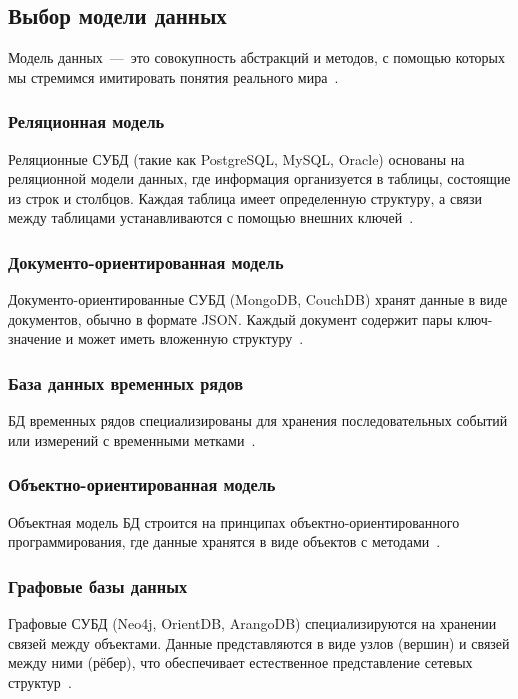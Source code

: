 \subsection{Выбор модели данных}

\noindent
\hspace{0.75cm}
Модель данных~---~это совокупность абстракций и методов, с помощью которых мы стремимся имитировать понятия реального мира~\cite{komarov}.

\subsubsection{Реляционная модель}

\noindent
\hspace{0.75cm}
Реляционные СУБД (такие как PostgreSQL, MySQL, Oracle) основаны на реляционной модели данных, где информация организуется в таблицы, состоящие из строк и столбцов. Каждая таблица имеет определенную структуру, а связи между таблицами устанавливаются с помощью внешних ключей~\cite{vas_hus}.

\subsubsection{Документо-ориентированная модель}

\noindent
\hspace{0.75cm}
Документо-ориентированные СУБД (MongoDB, CouchDB) хранят данные в виде документов, обычно в формате JSON. Каждый документ содержит пары ключ-значение и может иметь вложенную структуру~\cite{luchinina}.

\subsubsection{База данных временных рядов}

\noindent
\hspace{0.75cm}
БД временных рядов специализированы для хранения последовательных событий или измерений с временными метками~\cite{komarov}.

\subsubsection{Объектно-ориентированная модель}

\noindent
\hspace{0.75cm}
Объектная модель БД строится на принципах объектно-ориентированного программирования, где данные хранятся в виде объектов с методами~\cite{eldar}.

\subsubsection{Графовые базы данных}

\noindent
\hspace{0.75cm}
Графовые СУБД (Neo4j, OrientDB, ArangoDB) специализируются на хранении связей между объектами. Данные представляются в виде узлов (вершин) и связей между ними (рёбер), что обеспечивает естественное представление сетевых структур~\cite{otradnov}.
